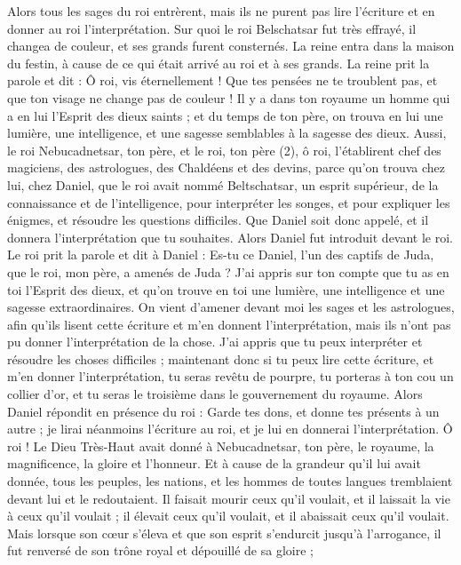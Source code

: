 \begin{multicols}{2}
Alors tous les sages du roi entrèrent, mais ils ne purent pas lire l'écriture et en donner au roi l'interprétation.
Sur quoi le roi Belschatsar fut très effrayé, il changea de couleur, et ses grands furent consternés.
La reine entra dans la maison du festin, à cause de ce qui était arrivé au roi et à ses grands. La reine prit la parole et dit : Ô roi, vis éternellement ! Que tes pensées ne te troublent pas, et que ton visage ne change pas de couleur !
Il y a dans ton royaume un homme qui a en lui l'Esprit des dieux saints ; et du temps de ton père,  on trouva en lui une lumière, une intelligence, et une sagesse semblables à la sagesse des dieux. Aussi, le roi Nebucadnetsar, ton père, et le roi, ton père (2), ô roi, l’établirent chef des magiciens, des astrologues, des Chaldéens et des devins,
parce qu’on trouva chez lui, chez Daniel, que le roi avait nommé  Beltschatsar, un esprit supérieur, de la connaissance et de l’intelligence, pour interpréter les songes, et pour expliquer les énigmes, et résoudre les questions difficiles. Que Daniel soit donc appelé, et il donnera l'interprétation que tu souhaites.
Alors Daniel fut introduit devant le roi. Le roi prit la parole et dit à Daniel : Es-tu ce Daniel, l’un des captifs de Juda, que le roi, mon père, a amenés de Juda ?
J’ai appris sur ton compte que tu as en toi l'Esprit des dieux, et qu’on trouve en toi une lumière, une intelligence et une sagesse extraordinaires.
On vient d’amener devant moi les sages et les astrologues, afin qu'ils lisent cette écriture et m'en donnent l'interprétation, mais ils n’ont pas pu donner l'interprétation de la chose.
J’ai appris que tu peux interpréter et résoudre les choses difficiles ; maintenant donc si tu peux lire cette écriture, et m'en donner l'interprétation, tu seras revêtu de pourpre, tu porteras à ton cou un collier d'or, et tu seras le troisième dans le gouvernement du royaume.
Alors Daniel répondit en présence du roi : Garde tes dons, et donne tes présents à un autre ; je lirai néanmoins l'écriture au roi, et je lui en donnerai l'interprétation.
Ô roi ! Le Dieu Très-Haut avait donné à Nebucadnetsar, ton père, le royaume, la magnificence, la gloire et l'honneur.
Et à cause de la grandeur qu'il lui avait donnée, tous les peuples, les nations, et les hommes de toutes langues tremblaient devant lui et le redoutaient. Il faisait mourir ceux qu'il voulait, et il laissait la vie à ceux qu'il voulait ; il élevait ceux qu'il voulait, et il abaissait ceux qu'il voulait.
Mais lorsque son cœur s’éleva et que son esprit s’endurcit jusqu’à l’arrogance, il fut renversé de son trône royal et dépouillé de sa gloire ;

\end{multicols}
